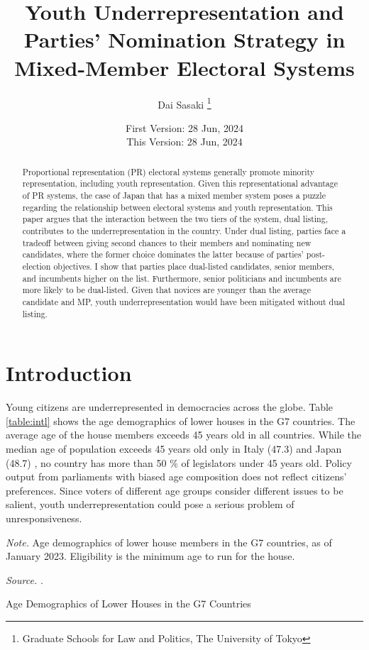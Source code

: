 \documentclass[a4paper, 11pt]{article}
\title{Youth Underrepresentation and Parties' Nomination Strategy in Mixed-Member Electoral Systems}
\author{Dai Sasaki \thanks{Graduate Schools for Law and Politics, The University of Tokyo}}
\date{
	First Version: 28 Jun, 2024 \\
	This Version: 28 Jun, 2024 
}
\begin{document}
\maketitle

\begin{abstract}  %
Proportional representation (PR) electoral systems generally promote minority representation, including youth representation. Given this representational advantage of PR systems, the case of Japan that has a mixed member system poses a puzzle regarding the relationship between electoral systems and youth representation. This paper argues that the interaction between the two tiers of the system, dual listing, contributes to the underrepresentation in the country. Under dual listing, parties face a tradeoff between giving second chances to their members and nominating new candidates, where the former choice dominates the latter because of parties' post-election objectives. I show that parties place dual-listed candidates, senior members, and incumbents higher on the list. Furthermore, senior politicians and incumbents are more likely to be dual-listed. Given that novices are younger than the average candidate and MP, youth underrepresentation would have been mitigated without dual listing. 
\end{abstract}

\newpage

\section{Introduction}

Young citizens are underrepresented in democracies across the globe. Table \ref{table:intl} shows the age demographics of lower houses in the G7 countries. The average age of the house members exceeds 45 years old in all countries. While the median age of population exceeds 45 years old only in Italy (47.3) and Japan (48.7) \citep{un2022}, no country has more than 50 \% of legislators under 45 years old. Policy output from parliaments with biased age composition does not reflect citizens' preferences. Since voters of different age groups consider different issues to be salient, youth underrepresentation could pose a serious problem of unresponsiveness. 

\begin{table}[htbp]
\begin{center}
\begin{threeparttable}

\begin{tablenotes}[flushleft]
  \scriptsize{
    \item{\textit{Note.} Age demographics of lower house members in the G7 countries, as of January 2023. Eligibility is the minimum age to run for the house.}
    \item{\textit{Source.} \citet{ipu2023}.}
  }
\end{tablenotes}
\end{threeparttable}
\caption{Age Demographics of Lower Houses in the G7 Countries}
\label{table:intl}
\end{center}
\end{table}
\end{document}
